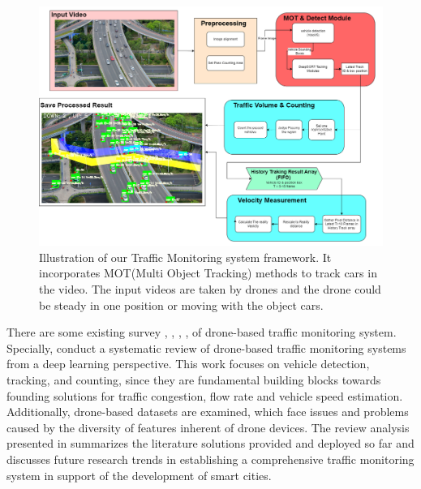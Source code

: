 \documentclass[10pt,twocolumn,letterpaper]{article}  %
\begin{document}
\begin{figure}[!t]
	\centering
	\includegraphics[width=0.95\linewidth]{./figures/traffic_monitoring_system_design.png} %
	\caption{Illustration of our Traffic Monitoring system framework. It incorporates MOT(Multi Object Tracking) methods to track cars in the video. The input videos are taken by drones and the drone could be steady in one position or moving with the object cars.}
	\label{fig:our-pipeline}
\end{figure}


There are some existing survey \cite{outay2020applications}, \cite{bisio2022systematic}, \cite{khan2017uav}, \cite{puri2005survey}, \cite{heintz2007images} of drone-based traffic monitoring system. Specially, \cite{bisio2022systematic} conduct a systematic review of drone-based traffic monitoring systems from a deep learning perspective. This work focuses on vehicle detection, tracking, and counting, since they are fundamental building blocks towards founding solutions for traffic congestion, flow rate and vehicle speed estimation. Additionally, drone-based datasets are examined, which face issues and problems caused by the diversity of features inherent of drone devices. The review analysis presented in \cite{bisio2022systematic} summarizes the literature solutions provided and deployed so far and discusses future research trends in establishing a comprehensive traffic monitoring system in support of the development of smart cities.
\end{document}
